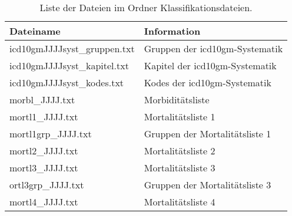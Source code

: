 \begin{table}[ht]
	\centering
	\small
	\caption{Liste der Dateien im Ordner Klassifikationsdateien.}
	\label{tab:classfiles}
	\begin{tabular}{|l|l|}
		\hline
		\rowcolor{lightgray} Dateiname & Information \\
		\hline 
		\textsf{icd10gmJJJJsyst\_gruppen.txt} &  Gruppen der \ac{icd10gm}-Systematik \\ \hline
		\textsf{icd10gmJJJJsyst\_kapitel.txt} & Kapitel der \ac{icd10gm}-Systematik \\ \hline
		\textsf{icd10gmJJJJsyst\_kodes.txt} & Kodes der \ac{icd10gm}-Systematik \\ \hline
		\textsf{morbl\_JJJJ.txt} & Morbiditätsliste  \\ \hline
		\textsf{mortl1\_JJJJ.txt} & Mortalitätsliste 1 \\ \hline
		\textsf{mortl1grp\_JJJJ.txt} & Gruppen der Mortalitätsliste 1 \\ \hline
		\textsf{mortl2\_JJJJ.txt} & Mortalitätsliste 2 \\ \hline
		\textsf{mortl3\_JJJJ.txt} & Mortalitätsliste 3 \\ \hline
		\textsf{ortl3grp\_JJJJ.txt} & Gruppen der Mortalitätsliste 3 \\ \hline
		\textsf{mortl4\_JJJJ.txt} & Mortalitätsliste 4 \\ \hline
	\end{tabular}
\end{table}



